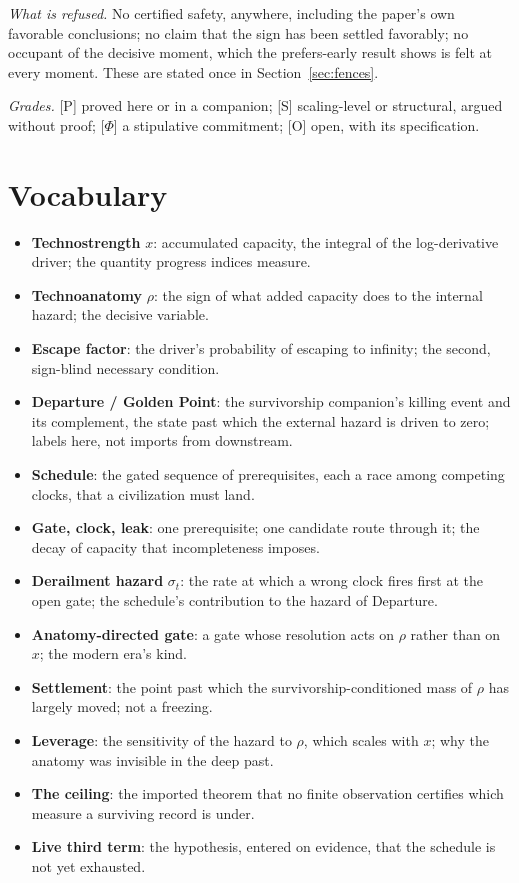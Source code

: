 \emph{What is refused.} No certified safety, anywhere, including the
paper's own favorable conclusions; no claim that the sign has been
settled favorably; no occupant of the decisive moment, which the
prefers-early result shows is felt at every moment. These are stated once
in Section~\ref{sec:fences}.

\emph{Grades.} [P] proved here or in a companion; [S] scaling-level or
structural, argued without proof; [$\Phi$] a stipulative commitment; [O]
open, with its specification.

\section{Vocabulary}\label{sec:vocab}
\begin{itemize}[itemsep=2pt]
\item \textbf{Technostrength} $x$: accumulated capacity, the integral of
the log-derivative driver; the quantity progress indices measure.
\item \textbf{Technoanatomy} $\rho$: the sign of what added capacity does
to the internal hazard; the decisive variable.
\item \textbf{Escape factor}: the driver's probability of escaping to
infinity; the second, sign-blind necessary condition.
\item \textbf{Departure / Golden Point}: the survivorship companion's
killing event and its complement, the state past which the external
hazard is driven to zero; labels here, not imports from downstream.
\item \textbf{Schedule}: the gated sequence of prerequisites, each a race
among competing clocks, that a civilization must land.
\item \textbf{Gate, clock, leak}: one prerequisite; one candidate route
through it; the decay of capacity that incompleteness imposes.
\item \textbf{Derailment hazard} $\sigma_t$: the rate at which a wrong
clock fires first at the open gate; the schedule's contribution to the
hazard of Departure.
\item \textbf{Anatomy-directed gate}: a gate whose resolution acts on
$\rho$ rather than on $x$; the modern era's kind.
\item \textbf{Settlement}: the point past which the survivorship-conditioned
mass of $\rho$ has largely moved; not a freezing.
\item \textbf{Leverage}: the sensitivity of the hazard to $\rho$, which
scales with $x$; why the anatomy was invisible in the deep past.
\item \textbf{The ceiling}: the imported theorem that no finite
observation certifies which measure a surviving record is under.
\item \textbf{Live third term}: the hypothesis, entered on evidence, that
the schedule is not yet exhausted.
\end{itemize}

